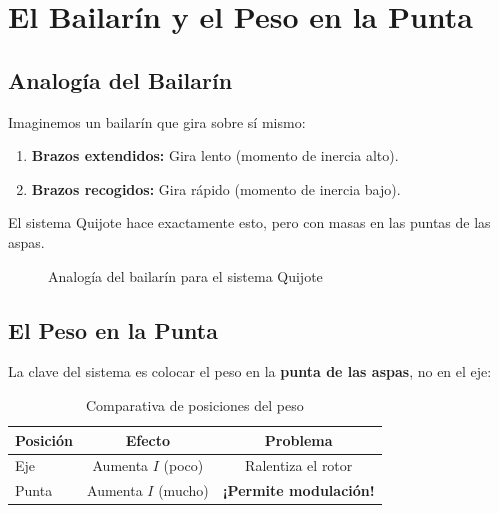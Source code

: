 \documentclass[12pt,a4paper]{article}
\begin{document}
\section{El Bailarín y el Peso en la Punta}

\subsection{Analogía del Bailarín}

Imaginemos un bailarín que gira sobre sí mismo:

\begin{enumerate}
    \item \textbf{Brazos extendidos:} Gira lento (momento de inercia alto).
    \item \textbf{Brazos recogidos:} Gira rápido (momento de inercia bajo).
\end{enumerate}

El sistema Quijote hace exactamente esto, pero con masas en las puntas de las aspas.

\begin{figure}[H]
\centering
{}
\caption{Analogía del bailarín para el sistema Quijote}
\label{fig:bailarin}
\end{figure}

\subsection{El Peso en la Punta}

La clave del sistema es colocar el peso en la \textbf{punta de las aspas}, no en el eje:

\begin{table}[H]
\centering
\caption{Comparativa de posiciones del peso}
\label{tab:posiciones}
\begin{tabular}{@{}lcc@{}}
\toprule
\textbf{Posición} & \textbf{Efecto} & \textbf{Problema} \\
\midrule
Eje & Aumenta $I$ (poco) & Ralentiza el rotor \\
Punta & Aumenta $I$ (mucho) & \textbf{¡Permite modulación!} \\
\bottomrule
\end{tabular}
\end{table}
\end{document}
